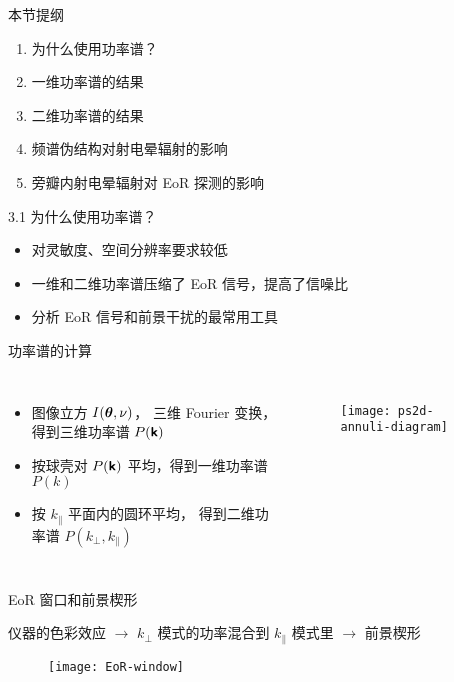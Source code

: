 \documentclass{beamer}
\begin{document}
\begin{frame}
  \begin{block}{本节提纲}
  \begin{enumerate}
    \item 为什么使用功率谱？
    \item 一维功率谱的结果
    \item 二维功率谱的结果
    \item 频谱伪结构对射电晕辐射的影响
    \item 旁瓣内射电晕辐射对 EoR 探测的影响
  \end{enumerate}
  \end{block}
\end{frame}

\begin{frame}{3.1 为什么使用功率谱？}
  \begin{itemize}
    \item 对灵敏度、空间分辨率要求较低
    \item 一维和二维功率谱压缩了 EoR 信号，提高了信噪比
    \item 分析 EoR 信号和前景干扰的最常用工具
  \end{itemize}
\end{frame}

\begin{frame}[t]
  \begin{alertblock}{功率谱的计算}
  \end{alertblock}
  \begin{columns}
    \begin{itemize}
      \item \alert{图像立方} $I(\bm{\mathsf{\theta}}, \nu)$，
        三维 Fourier 变换，得到\alert{三维功率谱} $P(\bm{\mathsf{k}})$
      \item 按球壳对 $P(\bm{\mathsf{k}})$ 平均，得到\alert{一维功率谱} $P(k)$
      \item 按 $k_{\parallel}$ 平面内的圆环平均，
        得到\alert{二维功率谱} $P(k_{\perp}, k_{\parallel})$
    \end{itemize}

    \begin{figure}
      \centering
      \texttt{[image: ps2d-annuli-diagram]}
    \end{figure}
  \end{columns}
\end{frame}

\begin{frame}[t]
  \begin{alertblock}{EoR 窗口和前景楔形}
  \end{alertblock}
  仪器的色彩效应 $\rightarrow$
  $k_{\perp}$ 模式的功率混合到 $k_{\parallel}$ 模式里 $\rightarrow$
  前景楔形
  \begin{figure}
    \centering
    \texttt{[image: EoR-window]}
  \end{figure}
\end{frame}
\end{document}
